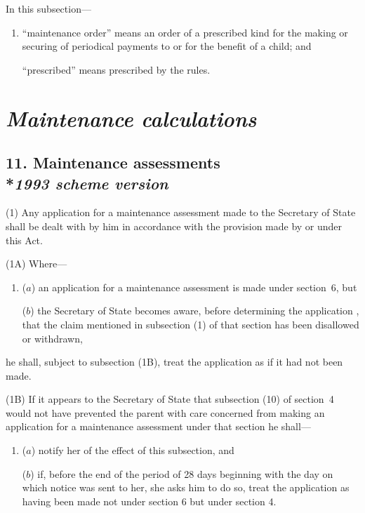 \documentclass[12pt,a4paper]{article}
\begin{document}
In this subsection—
\begin{enumerate}\item[]
    “maintenance order” means an order of a prescribed kind for the making or securing of periodical payments to or for the benefit of a child; and

    “prescribed” means prescribed by the rules. 
\end{enumerate}


\section{\itshape 
\emph{Maintenance calculations}  %
}

\subsection[11. Maintenance assessments --- \emph{1993 scheme version}]{11. Maintenance assessments\\*\emph{1993 scheme version}}

(1) Any application for a maintenance assessment made to the Secretary of State shall be 
dealt with by him  %
in accordance with the provision made by or under this Act.

(1A) Where—
\begin{enumerate}\item[]
($a$) an application for a maintenance assessment is made under section~6, but

($b$) the Secretary of State becomes aware, 
before determining the application%
, that the claim mentioned in subsection (1) of that section has been disallowed or withdrawn,
\end{enumerate}
he shall, subject to subsection (1B), treat the application as if it had not been made.

(1B) If it appears to the Secretary of State that subsection (10) of section~4 would not have prevented the parent with care concerned from making an application for a maintenance assessment under that section he shall—
\begin{enumerate}\item[]
($a$) notify her of the effect of this subsection, and

($b$) if, before the end of the period of 28 days beginning with the day on which notice was sent to her, she asks him to do so, treat the application as having been made not under section 6 but under section 4.
\end{enumerate}
\end{document}
